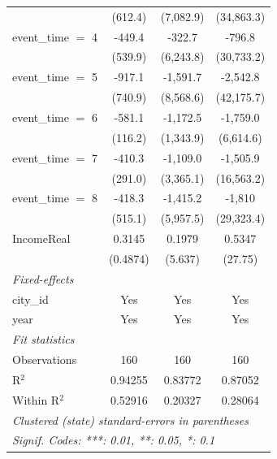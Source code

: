\begin{tabular}{lccc}
                        & (612.4)               & (7,082.9)              & (34,863.3)\\   
   event\_time $=$ 4    & -449.4                & -322.7                 & -796.8\\   
                        & (539.9)               & (6,243.8)              & (30,733.2)\\   
   event\_time $=$ 5    & -917.1                & -1,591.7               & -2,542.8\\   
                        & (740.9)               & (8,568.6)              & (42,175.7)\\   
   event\_time $=$ 6    & -581.1                & -1,172.5               & -1,759.0\\   
                        & (116.2)               & (1,343.9)              & (6,614.6)\\   
   event\_time $=$ 7    & -410.3                & -1,109.0               & -1,505.9\\   
                        & (291.0)               & (3,365.1)              & (16,563.2)\\   
   event\_time $=$ 8    & -418.3                & -1,415.2               & -1,810\\   
                        & (515.1)               & (5,957.5)              & (29,323.4)\\   
   IncomeReal           & 0.3145                & 0.1979                 & 0.5347\\   
                        & (0.4874)              & (5.637)                & (27.75)\\   
   \midrule
   \emph{Fixed-effects}\\
   city\_id             & Yes                   & Yes                    & Yes\\  
   year                 & Yes                   & Yes                    & Yes\\  
   \midrule
   \emph{Fit statistics}\\
   Observations         & 160                   & 160                    & 160\\  
   R$^2$                & 0.94255               & 0.83772                & 0.87052\\  
   Within R$^2$         & 0.52916               & 0.20327                & 0.28064\\  
   \midrule \midrule
   \multicolumn{4}{l}{\emph{Clustered (state) standard-errors in parentheses}}\\
   \multicolumn{4}{l}{\emph{Signif. Codes: ***: 0.01, **: 0.05, *: 0.1}}\\
\end{tabular}
\par\endgroup


